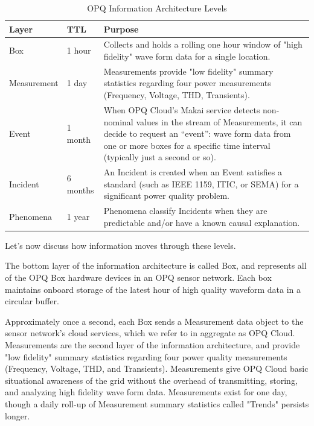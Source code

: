 \begin{table}[ht]
\caption{OPQ Information Architecture Levels}
\centering
\begin{tabular}{llp{4in}}
\toprule
\textbf{Layer}	& \textbf{TTL}	& \textbf{Purpose}\\
\midrule
Box		& 1 hour			& Collects and holds a rolling one hour window of "high fidelity" wave form data for a single location.\\
Measurement		& 1 day			& Measurements provide "low fidelity" summary statistics regarding four power measurements (Frequency, Voltage, THD, Transients). \\
Event & 1 month & When OPQ Cloud's Makai service detects non-nominal values in the stream of Measurements, it can decide to request an ``event'': wave form data from one or more boxes for a specific time interval (typically just a second or so). \\
Incident & 6 months & An Incident is created when an Event satisfies a standard (such as IEEE 1159, ITIC, or SEMA) for a significant power quality problem.\\
Phenomena & 1 year & Phenomena classify Incidents when they are predictable and/or have a known causal explanation. \\
\bottomrule
\end{tabular}
\label{fig:information-architecture}
\end{table}

Let's now discuss how information moves through these levels.

The bottom layer of the information architecture is called Box, and represents all of the OPQ Box hardware devices in an OPQ sensor network. Each box maintains onboard storage of the latest hour of high quality waveform data in a circular buffer.

Approximately once a second, each Box sends a Measurement data object to the sensor network's cloud services, which we refer to in aggregate as OPQ Cloud. Measurements are the second layer of the information architecture, and provide "low fidelity" summary statistics regarding four power quality measurements (Frequency, Voltage, THD, and Transients). Measurements give OPQ Cloud basic situational awareness of the grid without the overhead of transmitting, storing, and analyzing high fidelity wave form data. Measurements exist for one day, though a daily roll-up of Measurement summary statistics called "Trends" persists longer.


